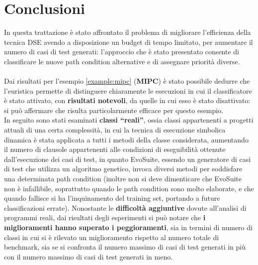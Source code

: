 \documentclass[a4paper, 12pt, oneside]{book}
\newcommand{\qq}[1]{``#1''}
\theoremstyle{normal}
\begin{document}
\chapter{Conclusioni}

In questa trattazione è stato affrontato il problema di migliorare l'efficienza della tecnica DSE avendo a disposizione un budget di tempo limitato, per aumentare il numero di casi di test generati: l'approccio che è stato presentato consente di classificare le nuove path condition alternative e di assegnare priorità diverse.
\\ \\ Dai risultati per l'esempio \ref{example:mipc} (\textbf{MIPC}) è stato possibile dedurre che l'euristica permette di distinguere chiaramente le esecuzioni in cui il classificatore è stato attivato, con \textbf{risultati notevoli}, da quelle in cui esso è stato disattivato: si può affermare che risulta particolarmente efficace per questo esempio.
\\ In seguito sono stati esaminati\textbf{ classi \qq{reali}}, ossia classi appartenenti a progetti attuali di una certa complessità, in cui la tecnica di esecuzione simbolica dinamica è stata applicata a tutti i metodi della classe considerata, aumentando il numero di clausole appartenenti alle condizioni di eseguibilità ottenute dall'esecuzione dei casi di test, in quanto EvoSuite, essendo un generatore di casi di test che utilizza un algoritmo genetico, invoca diversi metodi per soddisfare una determinata path condition (inoltre non si deve dimenticare che EvoSuite non è infallibile, soprattutto quando le path condition sono molto elaborate, e che quando fallisce si ha l'inquinamento del training set, portando a future classificazioni errate). Nonostante le \textbf{difficoltà aggiuntive} dovute all'analisi di programmi reali, dai risultati degli esperimenti si può notare che \textbf{i miglioramenti hanno superato i peggioramenti}, sia in termini di numero di classi in cui si è rilevato un miglioramento rispetto al numero totale di benchmark, sia se si confronta il numero massimo di casi di test generati in più con il numero massimo di casi di test generati in meno.
\end{document}
